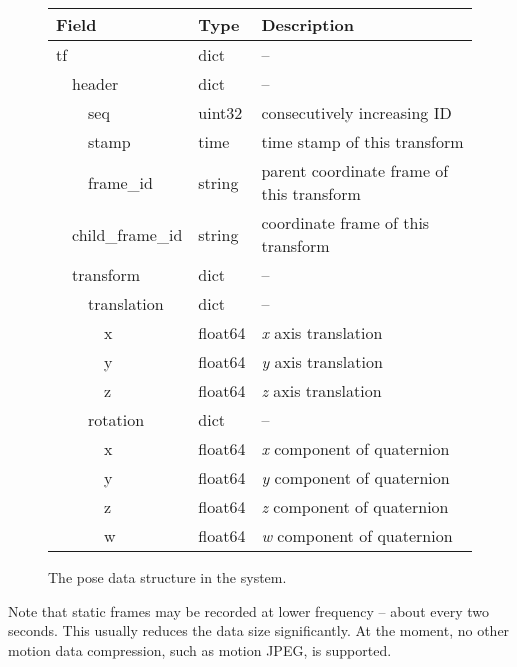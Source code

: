 \def\arraystretch{1.1}%
\begin{figure}[htb]
\begin{center}\begin{tabular}{ >{\ttfamily}p{3.5cm} >{\ttfamily}p{2cm} p{5cm} }
\toprule
\bf Field   & \bf Type & \bf Description \\ \midrule
tf			& dict	& -- \\
\ \ header		& dict		& -- \\
\ \ \ \ seq		& uint32	& consecutively increasing ID \\
\ \ \ \ stamp		& time		& time stamp of this transform \\
\ \ \ \ frame\_id	& string	& parent coordinate frame of this transform \\
\ \ child\_frame\_id	& string	& coordinate frame of this transform \\
\ \ transform		& dict		& -- \\
\ \ \ \ translation	& dict		& -- \\
\ \ \ \ \ \ x		& float64	& \emph{x} axis translation \\
\ \ \ \ \ \ y		& float64	& \emph{y} axis translation \\
\ \ \ \ \ \ z		& float64	& \emph{z} axis translation \\
\ \ \ \ rotation	& dict		& -- \\
\ \ \ \ \ \ x		& float64	& \emph{x} component of quaternion \\
\ \ \ \ \ \ y		& float64	& \emph{y} component of quaternion \\
\ \ \ \ \ \ z		& float64	& \emph{z} component of quaternion \\
\ \ \ \ \ \ w		& float64	& \emph{w} component of quaternion \\
\bottomrule
\end{tabular}\end{center}
\caption{The pose data structure in the \ease system.}
\label{fig:pose_data}
\end{figure}

Note that static frames may be recorded at lower frequency --
about every two seconds.
This usually reduces the data size significantly.
At the moment, no other motion data compression,
such as motion JPEG, is supported.


